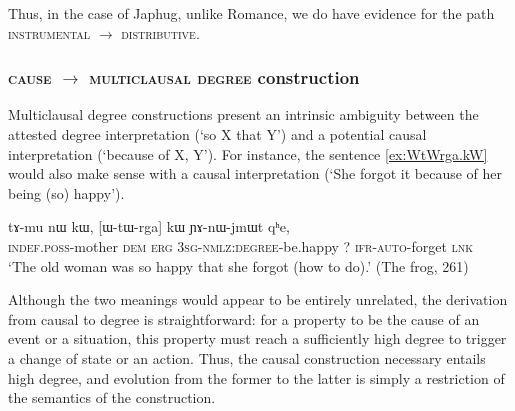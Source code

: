 \documentclass[oldfontcommands,oneside,a4paper,11pt]{article}
\newcommand{\ipa}[1]{{\phon #1}} %
\begin{document}
Thus, in the case of Japhug, unlike Romance, we do have evidence for the path \textsc{instrumental} $\rightarrow$ \textsc{distributive}.
  
 
  

\subsubsection{\textsc{cause} $\rightarrow$ \textsc{multiclausal degree} construction} \label{sec:cause2degree}

Multiclausal degree constructions  present an intrinsic ambiguity between the attested degree interpretation (`so X that Y') and a potential causal interpretation (`because of X, Y').  For instance, the sentence \ref{ex:WtWrga.kW} would also make sense  with a causal interpretation (`She forgot it because of her being (so) happy').



 \begin{exe} 
 \ex \label{ex:WtWrga.kW}
\gll 
\ipa{tɤ-mu}  	\ipa{nɯ}  	\ipa{kɯ,}  	  	[\ipa{ɯ-tɯ-rga}]  	\ipa{kɯ}  	\ipa{ɲɤ-nɯ-jmɯt}  	\ipa{qʰe,}  \\
\textsc{indef.poss}-mother \textsc{dem} \textsc{erg} \textsc{3sg-nmlz:degree}-be.happy ?{ } \textsc{ifr-auto}-forget  \textsc{lnk} \\
\glt `The old woman was so happy that she forgot (how to do).' (The frog, 261)
 \end{exe} 
 
 

% 
 

Although the two meanings would appear to be entirely unrelated, the derivation from causal to degree is straightforward: for a property to be the cause of an event or a situation, this property must reach a sufficiently high degree to trigger a change of state or an action. Thus,  the causal construction necessary entails high degree, and evolution from the former to the latter is simply a restriction of the semantics of the construction.
\end{document}
